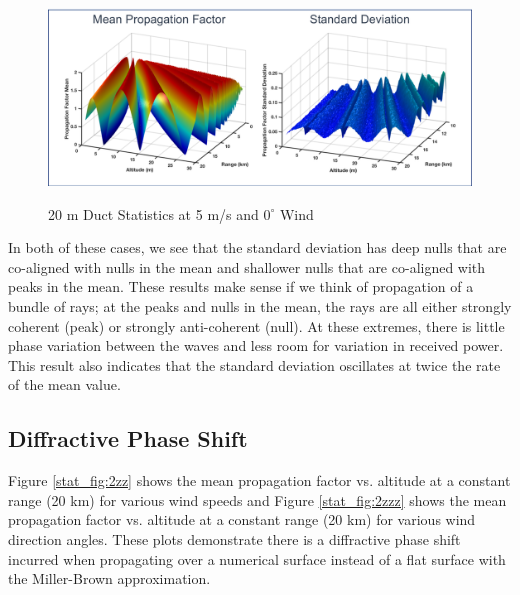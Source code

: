 \begin{figure}[H]
  \begin{center}
\includegraphics[width=5.5in]{../media/multistatic/duct_results.png}
  \end{center}
  \renewcommand{\baselinestretch}{1} \small\normalsize
  \begin{quote}
    \caption[20 m Duct Statistics at 5 m/s and $0^{\circ}$ Wind]{20 m Duct Statistics at 5 m/s and $0^{\circ}$ Wind\label{stat_fig:1zzz}}
  \end{quote}
\end{figure}
\renewcommand{\baselinestretch}{2} \small\normalsize

In both of these cases, we see that the standard deviation has deep nulls that are co-aligned with nulls in the mean and shallower nulls that are co-aligned with peaks in the mean. These results make sense if we think of propagation of a bundle of rays; at the peaks and nulls in the mean, the rays are all either strongly coherent (peak) or strongly anti-coherent (null). At these extremes, there is little phase variation between the waves and less room for variation in received power. This result also indicates that the standard deviation oscillates at twice the rate of the mean value. 

\subsection{Diffractive Phase Shift}
Figure \ref{stat_fig:2zz} shows the mean propagation factor vs. altitude at a constant range (20 km) for various wind speeds and Figure \ref{stat_fig:2zzz} shows the mean propagation factor vs. altitude at a constant range (20 km) for various wind direction angles. These plots demonstrate there is a diffractive phase shift incurred when propagating over a numerical surface instead of a flat surface with the Miller-Brown approximation.

